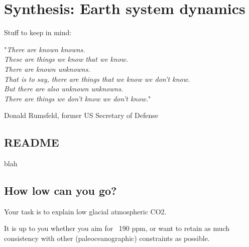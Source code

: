 \documentclass[11pt,fleqn]{book} %
\begin{document}

\cleardoublepage


\chapter{Synthesis: Earth system dynamics}

\hfill \break

\vspace{18mm}

\noindent Stuff to keep in mind:
\hfill \break

\noindent "\textit{There are known knowns.\\
These are things we know that we know.\\
There are known unknowns.\\
That is to say, there are things that we know we don't know.\\
But there are also unknown unknowns.\\
There are things we don't know we don't know.}"

\hfill \break
\noindent Donald Rumsfeld, former US Secretary of Defense


\newpage


\section{README}

blah


\newpage


\section{How low can you go?}

Your task is to explain low glacial atmospheric CO2.

It is up to you whether you aim for ~190 ppm, or want to retain as much consistency with other (paleoceanographic) constraints as possible.
\end{document}
